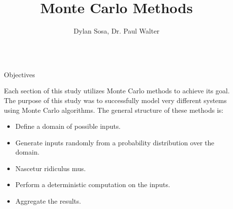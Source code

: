 \documentclass[final]{beamer}
\title{Monte Carlo Methods} %
\author{Dylan Sosa, Dr. Paul Walter} %
\institute{St.~Edward's University} %
\newlength{\sepwid}
\newlength{\onecolwid}
\begin{document}

\setlength{\belowcaptionskip}{2ex} %
\setlength\belowdisplayshortskip{2ex} %

\begin{frame}[t] %

\begin{columns}[t] %

\begin{column}{\sepwid}\end{column} %

\begin{column}{\onecolwid} %


\begin{alertblock}{Objectives}

Each section of this study utilizes Monte Carlo methods to achieve its goal. The purpose of this study was to successfully model very different systems using Monte Carlo algorithms. The general structure of these methods is:
\begin{itemize}
\item Define a domain of possible inputs.
\item Generate inputs randomly from a probability distribution over the domain.
\item Nascetur ridiculus mus.  
\item Perform a deterministic computation on the inputs.
\item Aggregate the results.
\end{itemize}

\end{alertblock}



\end{column}
\end{columns}
\end{frame}
\end{document}
